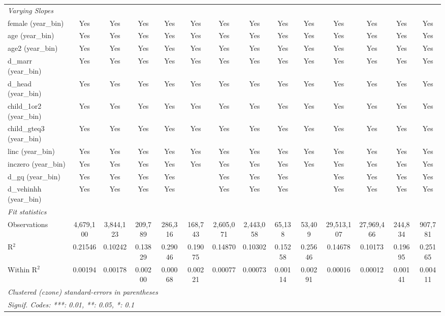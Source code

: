 \begin{tabular}{lccccccccccccc}
\midrule \emph{Varying Slopes}&   &   &   &   &   &   &   &   &   &   &   &   &  \\
female (year\_bin) & Yes & Yes & Yes & Yes & Yes & Yes & Yes & Yes & Yes & Yes & Yes & Yes & Yes\\
age (year\_bin) & Yes & Yes & Yes & Yes & Yes & Yes & Yes & Yes & Yes & Yes & Yes & Yes & Yes\\
age2 (year\_bin) & Yes & Yes & Yes & Yes & Yes & Yes & Yes & Yes & Yes & Yes & Yes & Yes & Yes\\
d\_marr (year\_bin) & Yes & Yes & Yes & Yes & Yes & Yes & Yes & Yes & Yes & Yes & Yes & Yes & Yes\\
d\_head (year\_bin) & Yes & Yes & Yes & Yes & Yes & Yes & Yes & Yes & Yes & Yes & Yes & Yes & Yes\\
child\_1or2 (year\_bin) & Yes & Yes & Yes & Yes & Yes & Yes & Yes & Yes & Yes & Yes & Yes & Yes & Yes\\
child\_gteq3 (year\_bin) & Yes & Yes & Yes & Yes & Yes & Yes & Yes & Yes & Yes & Yes & Yes & Yes & Yes\\
linc (year\_bin) & Yes & Yes & Yes & Yes & Yes & Yes & Yes & Yes & Yes & Yes & Yes & Yes & Yes\\
inczero (year\_bin) & Yes & Yes & Yes & Yes & Yes & Yes & Yes & Yes & Yes & Yes & Yes & Yes & Yes\\
d\_gq (year\_bin) & Yes & Yes & Yes & Yes &  & Yes & Yes & Yes &  & Yes & Yes & Yes & Yes\\
d\_vehinhh (year\_bin) & Yes & Yes & Yes & Yes &  & Yes & Yes & Yes &  & Yes & Yes & Yes & Yes\\
\midrule \emph{Fit statistics}&  & & & & & & & & & & & & \\
Observations & 4,679,100&3,844,123&209,789&286,316&168,743&2,605,071&2,443,058&65,138&53,409&29,513,107&27,969,466&244,834&907,781\\
R$^2$ & 0.21546&0.10242&0.13829&0.29046&0.19075&0.14870&0.10302&0.15258&0.25646&0.14678&0.10173&0.19695&0.25165\\
Within R$^2$ & 0.00194&0.00178&0.00200&0.00068&0.00221&0.00077&0.00073&0.00114&0.00291&0.00016&0.00012&0.00141&0.00411\\
\midrule\midrule\multicolumn{14}{l}{\emph{Clustered (czone) standard-errors in parentheses}}\\
\multicolumn{14}{l}{\emph{Signif. Codes: ***: 0.01, **: 0.05, *: 0.1}}\\
\end{tabular}


